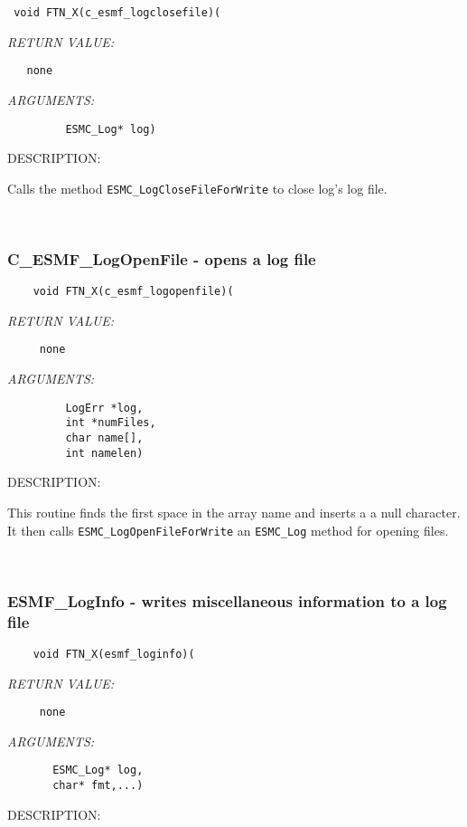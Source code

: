   
\begin{verbatim} 
 void FTN_X(c_esmf_logclosefile)(\end{verbatim}{\em RETURN VALUE:}
\begin{verbatim}   none\end{verbatim}{\em ARGUMENTS:}
\begin{verbatim}         ESMC_Log* log)\end{verbatim}
{\sf DESCRIPTION:\\ }


   Calls the method {\tt ESMC\_LogCloseFileForWrite} to close log's 
   log file.
   
 
\mbox{}\hrulefill\ 
 

  \subsubsection [C\_ESMF\_LogOpenFile] {C\_ESMF\_LogOpenFile - opens a log file}


\begin{verbatim}    void FTN_X(c_esmf_logopenfile)(\end{verbatim}{\em RETURN VALUE:}
\begin{verbatim}     none\end{verbatim}{\em ARGUMENTS:}
\begin{verbatim}         LogErr *log, 
         int *numFiles, 
         char name[], 
         int namelen)\end{verbatim}
{\sf DESCRIPTION:\\ }


   This routine finds the first space in the array name and inserts a
   a null character. It then calls {\tt ESMC\_LogOpenFileForWrite} 
   an {\tt ESMC\_Log} method for opening files. 
 
\mbox{}\hrulefill\ 
 
\subsubsection [ESMF\_LogInfo] {ESMF\_LogInfo - writes miscellaneous information to a log file}


  
\begin{verbatim}    void FTN_X(esmf_loginfo)(\end{verbatim}{\em RETURN VALUE:}
\begin{verbatim}     none\end{verbatim}{\em ARGUMENTS:}
\begin{verbatim}       ESMC_Log* log,
       char* fmt,...)\end{verbatim}
{\sf DESCRIPTION:\\ }


